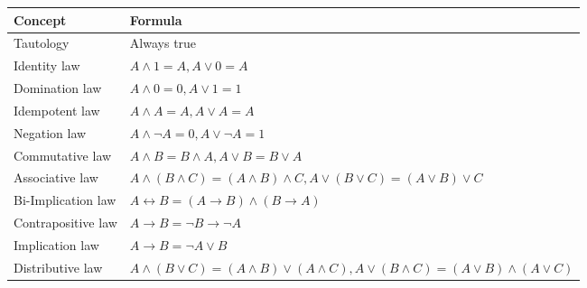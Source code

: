 \documentclass[a4paper,landscape]{article}
\begin{document}
\scriptsize

\begin{multicols*}{2}
    \begin{tabularx}{\columnwidth}{@{}lX@{}}
        \textbf{Concept}                           & \textbf{Formula}                                                                                                     \\\hline
        Tautology                                  & Always true                                                                                                          \\
        Identity law                               & $A \land 1 = A, A \lor 0 = A$                                                                                        \\
        Domination law                             & $A \land 0 = 0, A \lor 1 = 1$                                                                                        \\
        Idempotent law                             & $A \land A = A, A \lor A = A$                                                                                        \\
        Negation law                               & $A \land \neg A = 0, A \lor \neg A = 1$                                                                              \\
        Commutative law                            & $A \land B = B \land A, A \lor B = B \lor A$                                                                         \\
        Associative law                            & $A \land (B \land C) = (A \land B) \land C, A \lor (B \lor C) = (A \lor B) \lor C$                                   \\
        Bi-Implication law                         & $A \leftrightarrow B = (A \to B) \land (B \to A)$                                                                    \\
        Contrapositive law                         & $A \to B = \neg B \to \neg A$                                                                                        \\
        Implication law                            & $A \to B = \neg A \lor B$                                                                                            \\
        Distributive law                           & $A \land (B \lor C) = (A \land B) \lor (A \land C), A \lor (B \land C) = (A \lor B) \land (A \lor C)$                \\

\end{tabularx}
\end{multicols*}
\end{document}
